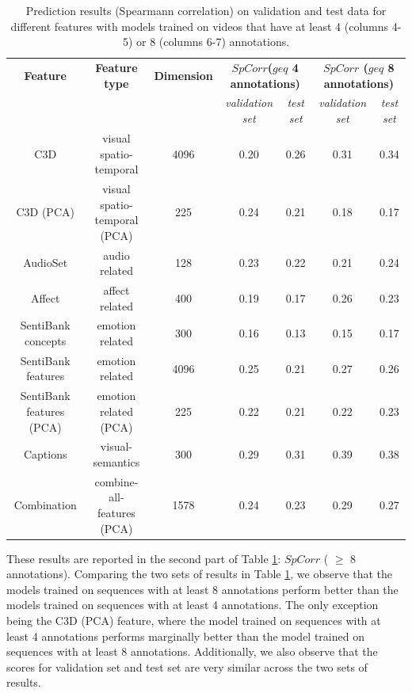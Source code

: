 \documentclass[sigconf]{acmart}
\begin{document}
\begin{table}
  \centering
  \renewcommand{\arraystretch}{1.2}
  \begin{tabular}{|c|c|c|c|c|c|c|}
    \hline
    \textbf{Feature} & \textbf{Feature type}& \textbf{Dimension}& \multicolumn{2}{c|}{\textbf{$SpCorr$($geq$ 4 annotations)}} & \multicolumn{2}{c|}{\textbf{$SpCorr$ ($geq$ 8 annotations)}}\\
    \cline{4-7}
    & & & \emph{validation set}& \emph{test set} & \emph{validation set}& \emph{test set}\\ \hline
    C3D& visual spatio-temporal& 4096& 0.20& 0.26& 0.31& 0.34\\ \hline
		C3D (PCA)& visual spatio-temporal (PCA)& 225& 0.24& 0.21& 0.18& 0.17\\ \hline
		AudioSet& audio related& 128& 0.23& 0.22& 0.21& 0.24\\ \hline
		Affect& affect related& 400& 0.19& 0.17& 0.26& 0.23\\ \hline
		SentiBank concepts& emotion related& 300& 0.16& 0.13& 0.15& 0.17\\ \hline
		SentiBank features& emotion related& 4096& 0.25& 0.21& 0.27& 0.26\\ \hline
		SentiBank features (PCA)& emotion related (PCA)& 225& 0.22& 0.21& 0.22& 0.23\\ \hline
		Captions& visual-semantics & 300& 0.29& 0.31& 0.39& 0.38 \\ \hline
		Combination& combine-all-features (PCA)& 1578& 0.24& 0.23& 0.29& 0.27\\ \hline		
    \hline
  \end{tabular}
  \caption{Prediction results (Spearmann correlation) on validation and test data for different features with models trained on videos that have at least 4 (columns 4-5) or 8 (columns 6-7) annotations.}
	\label{res-4-10-ann}	
\end{table}

These results are reported in the second part of Table \ref{res-4-10-ann}: $SpCorr$ ( $\geq$ 8 annotations).
Comparing the two sets of results in Table \ref{res-4-10-ann}, we observe that the models trained on sequences with at least 8 annotations perform better than the models trained on sequences with at least 4 annotations.
The only exception being the C3D (PCA) feature, where the model trained on sequences with at least 4 annotations performs marginally better than the model trained on sequences with at least 8 annotations. 
Additionally, we also observe that the scores for validation set and test set are very similar across the two sets of results.
\end{document}
